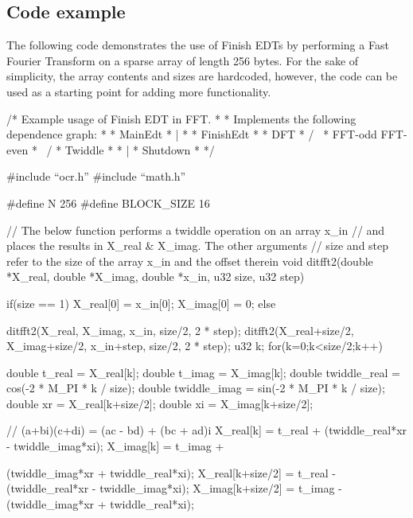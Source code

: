 \subsection{Code example}

The following code demonstrates the use of Finish EDTs by performing a Fast Fourier 
Transform on a sparse array of length 256 bytes. For the sake of simplicity, the 
array contents and sizes are hardcoded, however, the code can be used as a starting 
point for adding more functionality.

\begin{ocrsnip}


/* Example usage of Finish EDT in FFT.
 *
 * Implements the following dependence graph:
 *
 * MainEdt
 *    |
 *
 * FinishEdt
 * {
 *       DFT
 *      /   \
 * FFT-odd FFT-even
 *      \   /
 *     Twiddle
 * }
 *    |
 * Shutdown
 *
 */

#include ``ocr.h''
#include ``math.h''

#define N          256
#define BLOCK_SIZE 16

// The below function performs a twiddle operation on an array x_in
// and places the results in X_real & X_imag. The other arguments 
// size and step refer to the size of the array x_in and the offset therein
void ditfft2(double *X_real, double *X_imag, double *x_in, u32 size, u32 step) {
    if(size == 1) {
        X_real[0] = x_in[0];
        X_imag[0] = 0;
    } else {
        ditfft2(X_real, X_imag, x_in, size/2, 2 * step);
        ditfft2(X_real+size/2, X_imag+size/2, x_in+step, size/2, 2 * step);
        u32 k;
        for(k=0;k<size/2;k++) {
            double t_real = X_real[k];
            double t_imag = X_imag[k];
            double twiddle_real = cos(-2 * M_PI * k / size);
            double twiddle_imag = sin(-2 * M_PI * k / size);
            double xr = X_real[k+size/2];
            double xi = X_imag[k+size/2];

            // (a+bi)(c+di) = (ac - bd) + (bc + ad)i
            X_real[k] = t_real +
                (twiddle_real*xr - twiddle_imag*xi);
            X_imag[k] = t_imag +

                (twiddle_imag*xr + twiddle_real*xi);
            X_real[k+size/2] = t_real -
                (twiddle_real*xr - twiddle_imag*xi);
            X_imag[k+size/2] = t_imag -
                (twiddle_imag*xr + twiddle_real*xi);
        }
    }
}


\end{ocrsnip}
